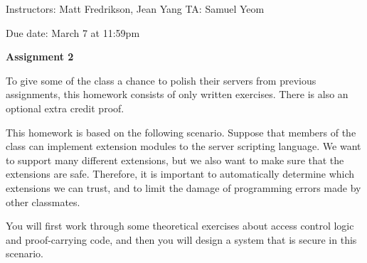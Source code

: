 \documentclass[11pt]{article}
\newcommand*{\stuname}{}
\newcommand*{\assignmentnumb}{2}
\begin{document}
\centerline{Instructors: Matt Fredrikson, Jean Yang \hfill TA: Samuel Yeom} 
\vspace{0.5ex}
Due date: March 7 at 11:59pm \\
\vspace{1.5ex}
\centerline{\Large\bf Assignment \assignmentnumb}
\vspace{0.5ex}
\centerline{\Large\bf \stuname}

To give some of the class a chance to polish their servers from previous assignments, this homework consists of only written exercises. There is also an optional extra credit proof.

This homework is based on the following scenario. Suppose that members of the class can implement extension modules to the server scripting language. We want to support many different extensions, but we also want to make sure that the extensions are safe. Therefore, it is important to automatically determine which extensions we can trust, and to limit the damage of programming errors made by other classmates.

You will first work through some theoretical exercises about access control logic and proof-carrying code, and then you will design a system that is secure in this scenario.
\end{document}

